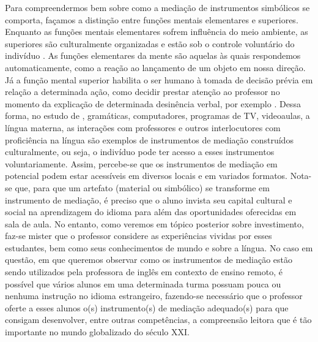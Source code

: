\documentclass{textolivre}
\begin{document}
Para compreendermos bem sobre como a mediação de instrumentos simbólicos se comporta, façamos a distinção entre funções mentais elementares e superiores. Enquanto as funções mentais elementares sofrem influência do meio ambiente, as superiores são culturalmente organizadas e estão sob o controle voluntário do indivíduo \cite[p. 27]{lantolf2009}. As funções elementares da mente são aquelas às quais respondemos automaticamente, como a reação ao lançamento de um objeto em nossa direção. Já a função mental superior habilita o ser humano à tomada de decisão prévia em relação a determinada ação, como decidir prestar atenção ao professor no momento da explicação de determinada desinência verbal, por exemplo \cite{lantolf2009}. Dessa forma, no estudo de \textcite{swain_sociocultural_2015}, gramáticas, computadores, programas de TV, videoaulas, a língua materna, as interações com professores e outros interlocutores com proficiência na língua são exemplos de instrumentos de mediação construídos culturalmente, ou seja, o indivíduo pode ter acesso a esses instrumentos voluntariamente. Assim, percebe-se que os instrumentos de mediação em potencial podem estar acessíveis em diversos locais e em variados formatos. Nota-se que, para que um artefato (material ou simbólico) se transforme em instrumento de mediação, é preciso que o aluno invista seu capital cultural e social na aprendizagem do idioma para além das oportunidades oferecidas em sala de aula. No entanto, como veremos em tópico posterior sobre investimento, faz-se mister que o professor considere as experiências vividas por esses estudantes, bem como seus conhecimentos de mundo e sobre a língua. No caso em questão, em que queremos observar como os instrumentos de mediação estão sendo utilizados pela professora de inglês em contexto de ensino remoto, é possível que vários alunos em uma determinada turma possuam pouca ou nenhuma instrução no idioma estrangeiro, fazendo-se necessário que o professor oferte a esses alunos o(s) instrumento(s) de mediação adequado(s) para que consigam desenvolver, entre outras competências, a compreensão leitora que é tão importante no mundo globalizado do século XXI.
\end{document}
